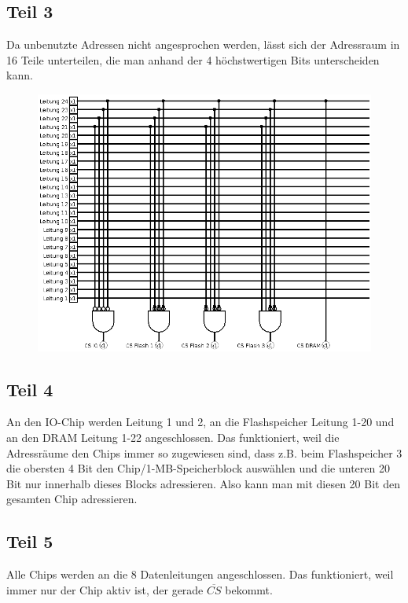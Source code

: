 \documentclass[10pt,a4paper]{article}
\begin{document}
\subsection*{Teil 3}
Da unbenutzte Adressen nicht angesprochen werden, lässt sich der Adressraum in 16 Teile unterteilen, die man anhand der 4 höchstwertigen Bits unterscheiden kann.
\begin{figure}[h]
\includegraphics[width=400pt]{11_4_3}
\end{figure}

\subsection*{Teil 4}

An den IO-Chip werden Leitung 1 und 2, an die Flashspeicher Leitung 1-20 und an den DRAM Leitung 1-22 angeschlossen.
Das funktioniert, weil die Adressräume den Chips immer so zugewiesen sind, dass z.B. beim Flashspeicher 3 die obersten 4 Bit den Chip/1-MB-Speicherblock auswählen und die unteren 20 Bit nur innerhalb dieses Blocks adressieren.
Also kann man mit diesen 20 Bit den gesamten Chip adressieren.

\subsection*{Teil 5}

Alle Chips werden an die 8 Datenleitungen angeschlossen.
Das funktioniert, weil immer nur der Chip aktiv ist, der gerade $\overline{CS}$ bekommt.
\end{document}
